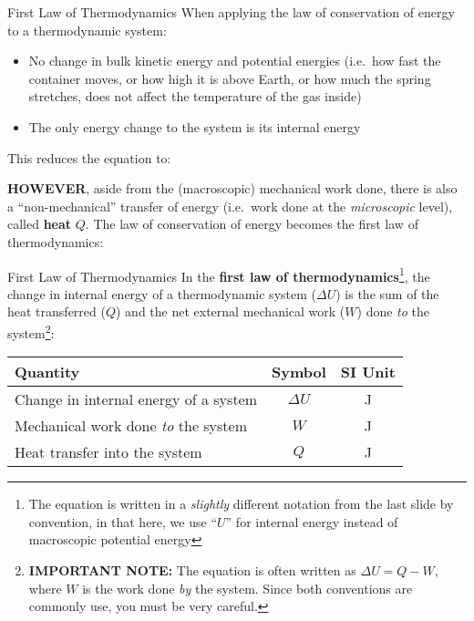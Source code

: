 \documentclass[12pt,aspectratio=169,dvipsnames]{beamer}
\begin{document}
\begin{frame}{First Law of Thermodynamics}
  When applying the law of conservation of energy to a thermodynamic system:
  \begin{itemize}
  \item No change in bulk kinetic energy and potential energies (i.e.\ how
    fast the container moves, or how high it is above Earth, or how much the
    spring stretches, does not affect the temperature of the gas inside)
  \item The only energy change to the system is its internal energy
  \end{itemize}
  This reduces the equation to:
  

  \textbf{HOWEVER}, aside from the (macroscopic) mechanical work done, there is
  also a ``non-mechanical'' transfer of energy (i.e.\ work done at the
  \emph{microscopic} level), called \textbf{heat} $Q$. The law of conservation
  of energy becomes the first law of thermodynamics:

\end{frame}



\begin{frame}{First Law of Thermodynamics}
  In the \textbf{first law of thermodynamics}\footnote{The equation is written
  in a \emph{slightly} different notation from the last slide by convention,
  in that here, we use ``$U$'' for internal energy instead of macroscopic
  potential energy},
  the change in internal energy of a thermodynamic system ($\Delta U$) is the
  sum of the heat transferred ($Q$) and the net external mechanical work ($W$)
  done \emph{to} the system\footnote{\textbf{IMPORTANT NOTE:} The equation is
  often written as $\Delta U=Q-W$, where $W$ is the work done \emph{by} the
  system. Since both conventions are commonly use, you must be very careful.}:
  
  \begin{center}
    \begin{tabular}{l|c|c}
      \rowcolor{pink}
      \textbf{Quantity} & \textbf{Symbol} & \textbf{SI Unit} \\ \hline
      Change in internal energy of a system & $\Delta U$ & \si\joule \\
      Mechanical work done \emph{to} the system & $W$    & \si\joule \\
      Heat transfer into the system & $Q$ & \si\joule
    \end{tabular}
  \end{center}
  \vspace{.3in}
\end{frame}
\end{document}
